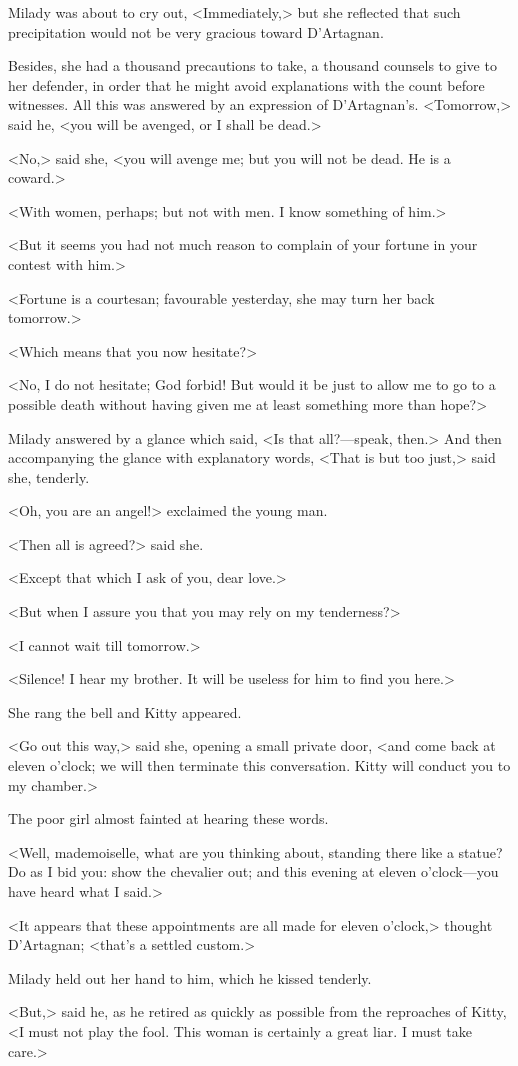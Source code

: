Milady was about to cry out, <Immediately,> but she reflected that such precipitation would not be very gracious toward D'Artagnan. 

Besides, she had a thousand precautions to take, a thousand counsels to give to her defender, in order that he might avoid explanations with the count before witnesses. All this was answered by an expression of D'Artagnan's. <Tomorrow,> said he, <you will be avenged, or I shall be dead.> 

<No,> said she, <you will avenge me; but you will not be dead. He is a coward.> 

<With women, perhaps; but not with men. I know something of him.> 

<But it seems you had not much reason to complain of your fortune in your contest with him.> 

<Fortune is a courtesan; favourable yesterday, she may turn her back tomorrow.> 

<Which means that you now hesitate?> 

<No, I do not hesitate; God forbid! But would it be just to allow me to go to a possible death without having given me at least something more than hope?> 

Milady answered by a glance which said, <Is that all?—speak, then.> And then accompanying the glance with explanatory words, <That is but too just,> said she, tenderly. 

<Oh, you are an angel!> exclaimed the young man. 

<Then all is agreed?> said she. 

<Except that which I ask of you, dear love.> 

<But when I assure you that you may rely on my tenderness?> 

<I cannot wait till tomorrow.> 

<Silence! I hear my brother. It will be useless for him to find you here.> 

She rang the bell and Kitty appeared. 

<Go out this way,> said she, opening a small private door, <and come back at eleven o'clock; we will then terminate this conversation. Kitty will conduct you to my chamber.> 

The poor girl almost fainted at hearing these words. 

<Well, mademoiselle, what are you thinking about, standing there like a statue? Do as I bid you: show the chevalier out; and this evening at eleven o'clock—you have heard what I said.> 

<It appears that these appointments are all made for eleven o'clock,> thought D'Artagnan; <that's a settled custom.> 

Milady held out her hand to him, which he kissed tenderly. 

<But,> said he, as he retired as quickly as possible from the reproaches of Kitty, <I must not play the fool. This woman is certainly a great liar. I must take care.> 